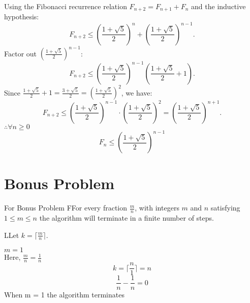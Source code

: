 \documentclass{report}
\begin{document}
\begin{inductstepWithTulip}
  Using the Fibonacci recurrence relation $F_{n+2} = F_{n+1} + F_{n}$ and the inductive hypothesis:
  \[ F_{n+2} \leq \left(\frac{1 + \sqrt{5}}{2}\right)^{n} + \left(\frac{1 + \sqrt{5}}{2}\right)^{n-1}. \]
  Factor out $\left(\frac{1 + \sqrt{5}}{2}\right)^{n-1}$:
  \[ F_{n+2} \leq \left(\frac{1 + \sqrt{5}}{2}\right)^{n-1} \left( \frac{1 + \sqrt{5}}{2} + 1 \right). \]
  Since $\frac{1 + \sqrt{5}}{2} + 1 = \frac{3 + \sqrt{5}}{2} = \left(\frac{1 + \sqrt{5}}{2}\right)^2$, we have:
  \[ F_{n+2} \leq \left(\frac{1 + \sqrt{5}}{2}\right)^{n-1} \cdot \left(\frac{1 + \sqrt{5}}{2}\right)^2 = \left(\frac{1 + \sqrt{5}}{2}\right)^{n+1}. \]
  $\therefore \forall n \geq 0$ 
  \[ F_{n} \leq \left(\frac{1 + \sqrt{5}}{2}\right)^{n-1} \]  
\end{inductstepWithTulip}

\section*{Bonus Problem}


\begin{ClaimWithMagnolia}{For Bonus Problem}
  FFor every fraction $\frac{m}{n}$,  with integers $m$ and $n$ satisfying $1 \leq m \leq n $ the algorithm will terminate in a finite number of steps.
\end{ClaimWithMagnolia}

\begin{RemarkWithLily}{1}
  LLet $k = \lceil \frac{m}{n} \rceil$.
\end{RemarkWithLily}

\begin{basecaseWithPoppy}
  $m = 1$ \\
  Here, $\frac{m}{n} = \frac{1}{n}$ \\
  \[k = \lceil \frac{n}{1} \rceil = n \] 
  \[\frac{1}{n} - \frac{1}{n} = 0 \]
  When m = 1 the algorithm terminates 
\end{basecaseWithPoppy}
\end{document}
